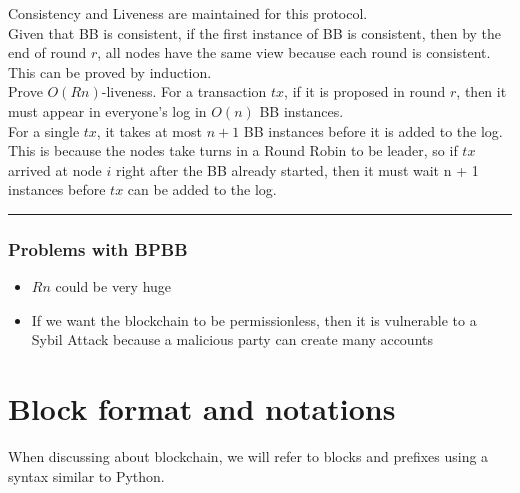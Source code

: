 \documentclass[twoside]{article}
\newenvironment{proof}{{\bf Proof:}}{\hfill\rule{2mm}{2mm}}
\begin{document}
\begin{proof} Consistency and Liveness are maintained for this protocol. \\
Given that BB is consistent, if the first instance of BB is consistent, then by the end of round $r$, all nodes have the same view because each round is consistent. This can be proved by induction. \\
Prove $O(Rn)$-liveness. For a transaction $tx$, if it is proposed in round $r$, then it must appear in everyone's log in $O(n)$ BB instances. \\ 
For a single $tx$, it takes at most $n + 1$ BB instances before it is added to the log. This is because the nodes take turns in a Round Robin to be leader, so if $tx$ arrived at node $i$ right after the BB already started, then it must wait n + 1 instances before $tx$ can be added to the log.
\end{proof} 

\subsubsection{Problems with BPBB}
\begin{itemize}
    \item $Rn$ could be very huge
    \item If we want the blockchain to be permissionless, then it is vulnerable to a Sybil Attack because a malicious party can create many accounts
\end{itemize}



\section{Block format and notations}

When discussing about blockchain, we will refer to blocks and prefixes using a syntax similar to Python. 
\end{document}
